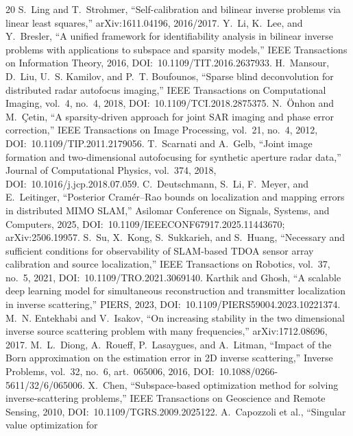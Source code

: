 \documentclass[12pt]{article}
\begin{document}
\begin{thebibliography}{20}
 S.~Ling and T.~Strohmer, ``Self-calibration and bilinear
inverse problems via linear least squares,'' arXiv:1611.04196, 2016/2017.
 Y.~Li, K.~Lee, and Y.~Bresler, ``A unified framework for
identifiability analysis in bilinear inverse problems with applications to
subspace and sparsity models,'' IEEE Transactions on Information Theory, 2016,
DOI:~10.1109/TIT.2016.2637933.
 H.~Mansour, D.~Liu, U.~S. Kamilov, and P.~T. Boufounos,
``Sparse blind deconvolution for distributed radar autofocus imaging,'' IEEE
Transactions on Computational Imaging, vol.~4, no.~4, 2018,
DOI:~10.1109/TCI.2018.2875375.
 N.~{\"O}nhon and M.~\c{C}etin, ``A sparsity-driven approach for
joint SAR imaging and phase error correction,'' IEEE Transactions on Image
Processing, vol.~21, no.~4, 2012, DOI:~10.1109/TIP.2011.2179056.
 T.~Scarnati and A.~Gelb, ``Joint image formation and
two-dimensional autofocusing for synthetic aperture radar data,'' Journal of
Computational Physics, vol.~374, 2018, DOI:~10.1016/j.jcp.2018.07.059.
 C.~Deutschmann, S.~Li, F.~Meyer, and E.~Leitinger,
``Posterior Cram\'er--Rao bounds on localization and mapping errors in
distributed MIMO SLAM,'' Asilomar Conference on Signals, Systems, and
Computers, 2025, DOI:~10.1109/IEEECONF67917.2025.11443670;
arXiv:2506.19957.
 S.~Su, X.~Kong, S.~Sukkarieh, and S.~Huang, ``Necessary and
sufficient conditions for observability of SLAM-based TDOA sensor array
calibration and source localization,'' IEEE Transactions on Robotics,
vol.~37, no.~5, 2021, DOI:~10.1109/TRO.2021.3069140.
 Karthik and Ghosh, ``A scalable deep learning model for
simultaneous reconstruction and transmitter localization in inverse
scattering,'' PIERS, 2023, DOI:~10.1109/PIERS59004.2023.10221374.
 M.~N. Entekhabi and V.~Isakov, ``On increasing stability
in the two dimensional inverse source scattering problem with many
frequencies,'' arXiv:1712.08696, 2017.
 M.~L.~Diong, A.~Roueff, P.~Lasaygues, and A.~Litman,
``Impact of the Born approximation on the estimation error in 2D inverse
scattering,'' Inverse Problems, vol.~32, no.~6, art.~065006, 2016,
DOI:~10.1088/0266-5611/32/6/065006.
 X.~Chen, ``Subspace-based optimization method for solving
inverse-scattering problems,'' IEEE Transactions on Geoscience and Remote
Sensing, 2010, DOI:~10.1109/TGRS.2009.2025122.
 A.~Capozzoli et al., ``Singular value optimization for

\end{thebibliography}
\end{document}
